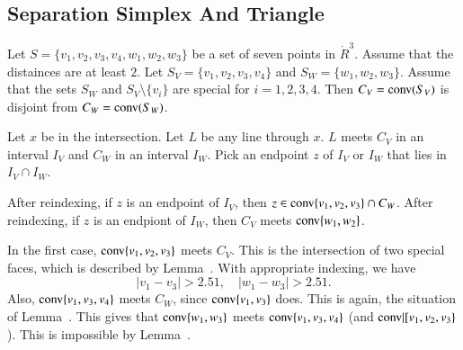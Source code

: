 \begin{tarskidata}
\begin{tarski}
\section{Separation Simplex And Triangle}

\begin{lemma}
Let $S=\{v_1,v_2,v_3,v_4,w_1,w_2,w_3\}$ be a set of seven points
in $\ring{R}^3$.  Assume that the distainces are at least $2$.
Let $S_V = \{v_1,v_2,v_3,v_4\}$ and $S_W=\{w_1,w_2,w_3\}$.  Assume
that the sets $S_W$ and $S_V\setminus\{v_i\}$ are special for
$i=1,2,3,4$.
Then $C_V={\operatorname{conv}}(S_V)$ is disjoint from $C_W={\operatorname{conv}}(S_W)$.
\end{lemma}

\begin{proved}  Let $x$ be in the intersection.
Let $L$ be any line through $x$.  $L$ meets $C_V$ in an interval
$I_V$ and $C_W$ in an interval $I_W$.  Pick an endpoint $z$
of $I_V$ or $I_W$ that lies in $I_V\cap I_W$.  

After reindexing, if $z$ is an endpoint of $I_V$, then
$z\in{\operatorname{conv}}\{v_1,v_2,v_3\}\cap C_W$.  After reindexing, if $z$
is an endpiont of $I_W$, then $C_V$ meets ${\operatorname{conv}}\{w_1,w_2\}$.

In the first case, ${\operatorname{conv}}\{v_1,v_2,v_3\}$ meets $C_V$.
This is the intersection of two special faces, which is described
by Lemma~.  With appropriate indexing, we have
$$
  |v_1-v_3|>2.51,\quad |w_1-w_3|>2.51.
$$
Also, ${\operatorname{conv}}\{v_1,v_3,v_4\}$ meets $C_W$, since ${\operatorname{conv}}\{v_1,v_3\}$
does.  This is again, the situation of Lemma~.
This gives that ${\operatorname{conv}}\{w_1,w_3\}$ meets ${\operatorname{conv}}\{v_1,v_3,v_4\}$
(and ${\operatorname{conv}}|[v_1,v_2,v_3\}$).  This is impossible by 
Lemma~.
\swallowed\end{proved}
\end{tarski}





\begin{tarski}


\end{tarski}
\end{tarskidata}
